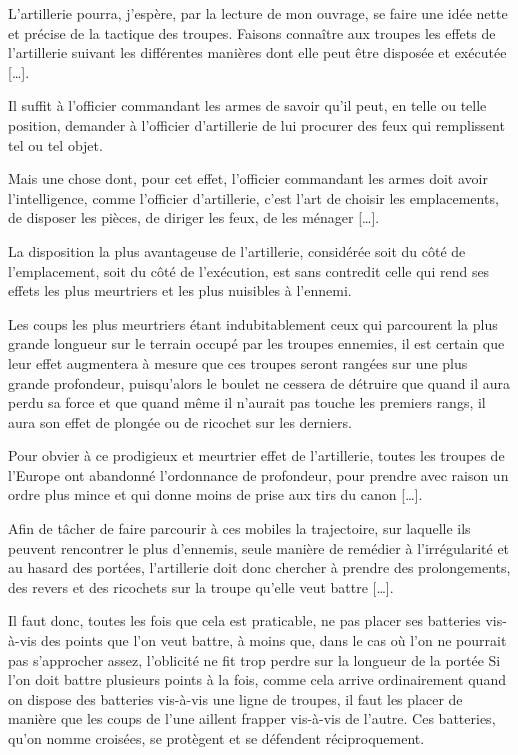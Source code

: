\documentclass[french,twoside]{book} %
\begin{document}
L’artillerie pourra, j’espère, par la lecture de mon ouvrage, se faire une idée nette et précise de la tactique des troupes. Faisons connaître aux troupes les effets de l’artillerie suivant les différentes manières dont elle peut être disposée et exécutée […].\par
Il suffit à l’officier commandant les armes de savoir qu’il peut, en telle ou telle position, demander à l’officier d’artillerie de lui procurer des feux qui remplissent tel ou tel objet.\par
Mais une chose dont, pour cet effet, l’officier commandant les armes doit avoir l’intelligence, comme l’officier d’artillerie, c’est l’art de choisir les emplacements, de disposer les pièces, de diriger les feux, de les ménager […].\par
La disposition la plus avantageuse de l’artillerie, considérée soit du côté de l’emplacement, soit du côté de l’exécution, est sans contredit celle qui rend ses effets les plus meurtriers et les plus nuisibles à l’ennemi.\par
Les coups les plus meurtriers étant indubitablement ceux qui parcourent la plus grande longueur sur le terrain occupé par les troupes ennemies, il est certain que leur effet augmentera à mesure que ces troupes seront rangées sur une plus grande profondeur, puisqu’alors le boulet ne cessera de détruire que quand il aura perdu sa force et que quand même il n’aurait pas touche les premiers rangs, il aura son effet de plongée ou de ricochet sur les derniers.\par
Pour obvier à ce prodigieux et meurtrier effet de l’artillerie, toutes les troupes de l’Europe ont abandonné l’ordonnance de profondeur, pour prendre avec raison un ordre plus mince et qui donne moins de prise aux tirs du canon […].\par
Afin de tâcher de faire parcourir à ces mobiles la trajectoire, sur laquelle ils peuvent rencontrer le plus d’ennemis, seule manière de remédier à l’irrégularité et au hasard des portées, l’artillerie doit donc chercher à prendre des prolongements, des revers et des ricochets sur la troupe qu’elle veut battre […].\par
Il faut donc, toutes les fois que cela est praticable, ne pas placer ses batteries vis-à-vis des points que l’on veut battre, à moins que, dans le cas où l’on ne pourrait pas s’approcher assez, l’oblicité ne fit trop perdre sur la longueur de la portée Si l’on doit battre plusieurs points à la fois, comme cela arrive ordinairement quand on dispose des batteries vis-à-vis une ligne de troupes, il faut les placer de manière que les coups de l’une aillent frapper vis-à-vis de l’autre. Ces batteries, qu’on nomme croisées, se protègent et se défendent réciproquement.\par
\end{document}
